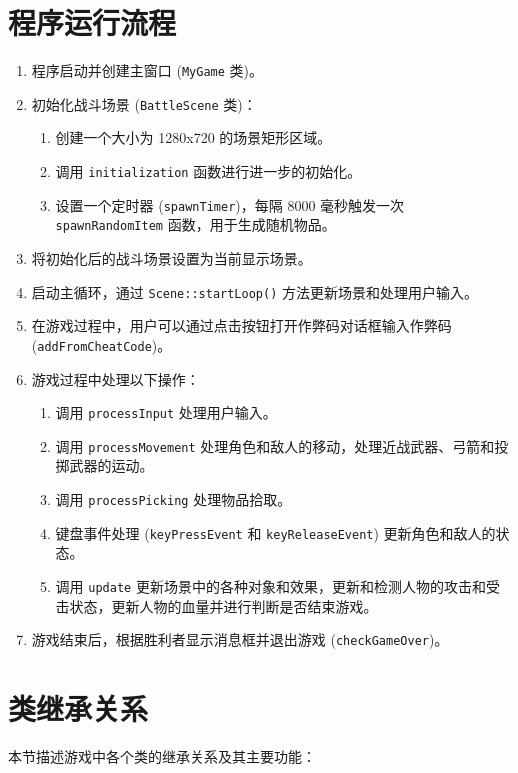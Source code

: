 \documentclass[UTF8]{ctexart}
\begin{document}
\section{程序运行流程}

\begin{enumerate}
    \item 程序启动并创建主窗口 (\texttt{MyGame} 类)。
    \item 初始化战斗场景 (\texttt{BattleScene} 类)：
    \begin{enumerate}
        \item 创建一个大小为 1280x720 的场景矩形区域。
        \item 调用 \texttt{initialization} 函数进行进一步的初始化。
        \item 设置一个定时器 (\texttt{spawnTimer})，每隔 8000 毫秒触发一次 \texttt{spawnRandomItem} 函数，用于生成随机物品。
    \end{enumerate}
    \item 将初始化后的战斗场景设置为当前显示场景。
    \item 启动主循环，通过 \texttt{Scene::startLoop()} 方法更新场景和处理用户输入。
    \item 在游戏过程中，用户可以通过点击按钮打开作弊码对话框输入作弊码 (\texttt{addFromCheatCode})。
    \item 游戏过程中处理以下操作：
    \begin{enumerate}
        \item 调用 \texttt{processInput} 处理用户输入。
        \item 调用 \texttt{processMovement} 处理角色和敌人的移动，处理近战武器、弓箭和投掷武器的运动。
        \item 调用 \texttt{processPicking} 处理物品拾取。
        \item 键盘事件处理 (\texttt{keyPressEvent} 和 \texttt{keyReleaseEvent}) 更新角色和敌人的状态。
        \item 调用 \texttt{update} 更新场景中的各种对象和效果，更新和检测人物的攻击和受击状态，更新人物的血量并进行判断是否结束游戏。
    \end{enumerate}
    \item 游戏结束后，根据胜利者显示消息框并退出游戏 (\texttt{checkGameOver})。
\end{enumerate}

\section{类继承关系}
本节描述游戏中各个类的继承关系及其主要功能：
\end{document}
